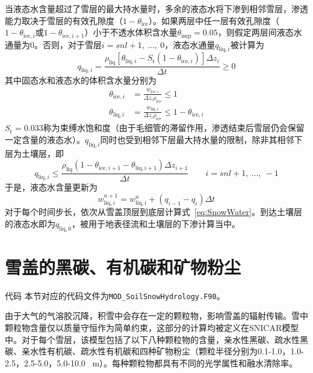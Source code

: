 当液态水含量超过了雪层的最大持水量时，多余的液态水将下渗到相邻雪层，渗透能力取决于雪层的有效孔隙度（$1-\theta_{\mathrm{ice}}$）。如果两层中任一层有效孔隙度（$1-\theta_{\mathrm{ice},i}$或$1-\theta_{\mathrm{ice},i+1}$）小于不透水体积含水量$\theta_{\mathrm{imp}}=0.05$，则假定两层间液态水通量为0。否则，对于雪层$i=snl+1,\ ...,\ 0$，液态水通量$q_{\mathrm{liq},i}$被计算为
\begin{equation}
  q_{\mathrm{liq},i}=\frac{\rho_{\mathrm{liq}}\left[\theta_{\mathrm{liq},i}-S_{\mathrm {r}} \left(1-\theta_{\mathrm{ice},i}\right)\right]\Delta z_{i} }{\Delta t}\geqslant 0
\end{equation}
其中固态水和液态水的体积含水量分别为
\begin{align}
  \theta_{\mathrm{ice},i}&=\frac{w_{\mathrm{ice},i}}{\Delta z_i \rho_{\mathrm{ice}}} \leqslant 1 \\
  \theta_{\mathrm{liq},i}&=\frac{w_{\mathrm{liq},i}}{\Delta z_i \rho_{\mathrm{ice}}} \leqslant 1-\theta_{\mathrm{ice},i}
\end{align}
$S_{\mathrm {r}} =0.033$称为束缚水饱和度（由于毛细管的滞留作用，渗透结束后雪层仍会保留一定含量的液态水）。$q_{\mathrm{liq},i}$同时也受到相邻下层最大持水量的限制，除非其相邻下层为土壤层，即
\begin{equation}
  q_{\mathrm{liq},i} \leqslant \frac{\rho_{\mathrm{liq}}\left(1-\theta_{\mathrm{ice},i+1}-\theta_{\mathrm{liq},i+1}\right)\Delta z_{i+1}}{\Delta t} \qquad i=snl+1,\ ...,\ -1
\end{equation}
于是，液态水含量更新为
\begin{equation}\label{eq:SnowWater}
  w_{\mathrm{liq},i}^{n+1}=w_{\mathrm{liq},i}^n+\left(q_{i-1}-q_i\right)\Delta t
\end{equation}
对于每个时间步长，依次从雪盖顶层到底层计算式~\eqref{eq:SnowWater}。到达土壤层的液态水即为$q_{\mathrm{liq,0}}$，被用于地表径流和土壤层的下渗计算当中。

\section{雪盖的黑碳、有机碳和矿物粉尘}
\begin{mymdframed}{代码}
  本节对应的代码文件为\texttt{MOD\_SoilSnowHydrology.F90}。
\end{mymdframed}
由于大气的气溶胶沉降，积雪中会存在一定的颗粒物，影响雪盖的辐射传输。雪中颗粒物含量仅以质量守恒作为简单约束，这部分的计算均被定义在SNICAR模型中。对于每个雪层，该模型包括了以下八种颗粒物的含量，亲水性黑碳、疏水性黑碳、亲水性有机碳、疏水性有机碳和四种矿物粉尘（颗粒半径分别为0.1-1.0，1.0-2.5，2.5-5.0，5.0-10.0 \unit{\mu m}）。每种颗粒物都具有不同的光学属性和融水清除率。

